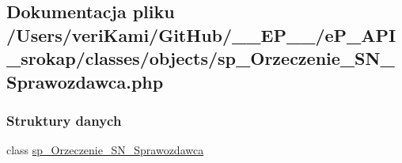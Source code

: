 \hypertarget{sp___orzeczenie___s_n___sprawozdawca_8php}{\subsection{Dokumentacja pliku /\-Users/veri\-Kami/\-Git\-Hub/\-\_\-\-\_\-\-E\-P\-\_\-\-\_\-/e\-P\-\_\-\-A\-P\-I\-\_\-srokap/classes/objects/sp\-\_\-\-Orzeczenie\-\_\-\-S\-N\-\_\-\-Sprawozdawca.php}
\label{sp___orzeczenie___s_n___sprawozdawca_8php}
}
\subsubsection*{Struktury danych}
\begin{DoxyCompactItemize}
\item 
class \hyperlink{classsp___orzeczenie___s_n___sprawozdawca}{sp\-\_\-\-Orzeczenie\-\_\-\-S\-N\-\_\-\-Sprawozdawca}
\end{DoxyCompactItemize}
